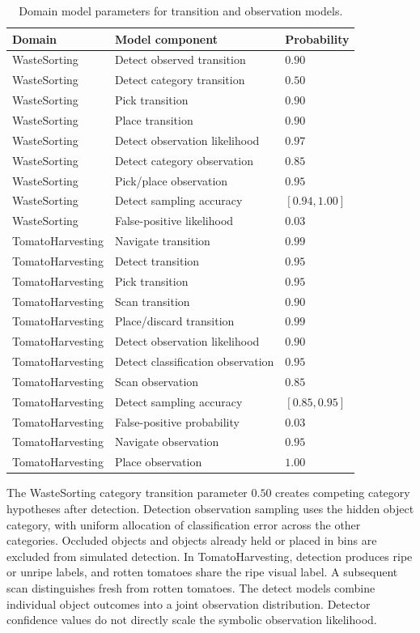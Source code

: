 \begin{table}[!htbp]
\centering
\caption{Domain model parameters for transition and observation models.}
\label{tab:app_model_params}
\small
\begin{tabular}{lll}
\toprule
\textbf{Domain} & \textbf{Model component} & \textbf{Probability} \\
\midrule
WasteSorting & Detect observed transition & $0.90$ \\
WasteSorting & Detect category transition & $0.50$ \\
WasteSorting & Pick transition & $0.90$ \\
WasteSorting & Place transition & $0.90$ \\
WasteSorting & Detect observation likelihood & $0.97$ \\
WasteSorting & Detect category observation & $0.85$ \\
WasteSorting & Pick/place observation & $0.95$ \\
WasteSorting & Detect sampling accuracy & $[0.94,1.00]$ \\
WasteSorting & False-positive likelihood & $0.03$ \\
\midrule
TomatoHarvesting & Navigate transition & $0.99$ \\
TomatoHarvesting & Detect transition & $0.95$ \\
TomatoHarvesting & Pick transition & $0.95$ \\
TomatoHarvesting & Scan transition & $0.90$ \\
TomatoHarvesting & Place/discard transition & $0.99$ \\
TomatoHarvesting & Detect observation likelihood & $0.90$ \\
TomatoHarvesting & Detect classification observation & $0.95$ \\
TomatoHarvesting & Scan observation & $0.85$ \\
TomatoHarvesting & Detect sampling accuracy & $[0.85,0.95]$ \\
TomatoHarvesting & False-positive probability & $0.03$ \\
TomatoHarvesting & Navigate observation & $0.95$ \\
TomatoHarvesting & Place observation & $1.00$ \\
\bottomrule
\end{tabular}
\end{table}

The WasteSorting category transition parameter $0.50$ creates competing category hypotheses after detection. Detection observation sampling uses the hidden object category, with uniform allocation of classification error across the other categories. Occluded objects and objects already held or placed in bins are excluded from simulated detection. In TomatoHarvesting, detection produces ripe or unripe labels, and rotten tomatoes share the ripe visual label. A subsequent scan distinguishes fresh from rotten tomatoes. The detect models combine individual object outcomes into a joint observation distribution. Detector confidence values do not directly scale the symbolic observation likelihood.

